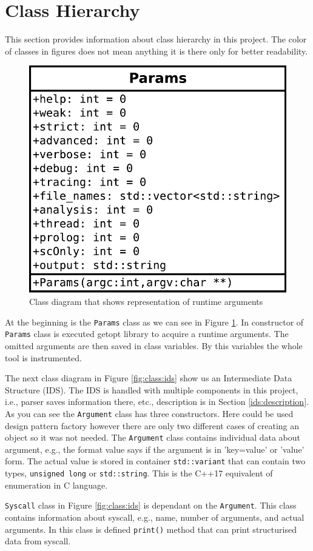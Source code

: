 \section{Class Hierarchy}
This section provides information about class hierarchy in this project. The
color of classes in figures does not mean anything it is there only for better
readability.

\begin{figure}[h]
	\centering
	\includegraphics[width=0.5\linewidth]{obrazky-figures/class/params.pdf}
	\caption{Class diagram that shows representation of runtime arguments}
	\label{fig:class:params}
\end{figure}

At the beginning is the \texttt{Params} class as we can see in Figure
\ref{fig:class:params}. In constructor of \texttt{Params} class is executed
getopt library to acquire a runtime arguments. The omitted arguments are then
saved in class variables. By this variables the whole tool is instrumented.

The next class diagram in Figure \ref{fig:class:ids} show us an Intermediate
Data Structure (IDS). The IDS is handled with multiple components in this
project, i.e., parser saves information there, etc., description is in Section
\ref{ids:description}. As you can see the \texttt{Argument} class has three
constructors.  Here could be used design pattern factory however there are only
two different cases of creating an object so it was not needed. The
\texttt{Argument} class contains individual data about argument, e.g., the
format value says if the argument is in 'key=value' or 'value' form. The actual
value is stored in container \texttt{std::variant} that can contain two types,
\texttt{unsigned long} or \texttt{std::string}. This is the C++17 equivalent of
enumeration in C language.


\texttt{Syscall} class in Figure \ref{fig:class:ids} is dependant  on the
\texttt{Argument}. This class contains information about syscall, e.g.,
name, number of arguments, and actual arguments. In this class is defined
\texttt{print()} method that can print structurised data from syscall.

